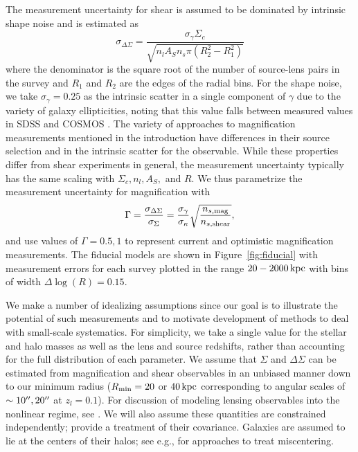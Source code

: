 \documentclass[12pt]{emulateapj}
\begin{document}
The measurement uncertainty for shear is assumed to be dominated by
intrinsic shape noise and is estimated as
\begin{equation}
\sigma_{\Delta\Sigma}=\frac{\sigma_{\gamma}\Sigma_c}{\sqrt{n_l A_S n_s
  \pi(R_2^2-R_1^2)}}
\end{equation}
where the denominator is the square root of the number of source-lens
pairs in the survey and $R_1$ and $R_2$ are the edges of the radial
bins. For the shape noise, we take
$\sigma_{\gamma}=0.25$ as the intrinsic scatter in a single component
of $\gamma$ due to the variety of galaxy ellipticities, noting that this
value falls between measured values in SDSS \citet{Hirata2004} and
COSMOS \citet{Leauthaud2007}. The variety of approaches to
magnification measurements mentioned in the introduction have
differences in their source selection and in the intrinsic scatter for
the observable. While these properties differ from shear experiments
in general, the measurement uncertainty typically 
has the same scaling with $\Sigma_c, n_l, A_S,$ and $R$. We thus
parametrize the measurement uncertainty for magnification with 
\begin{equation}
\Gamma = \frac{\sigma_{\Delta\Sigma}}{\sigma_{\Sigma}} =
\frac{\sigma_\gamma}{\sigma_\kappa}\sqrt{\frac{n_{s, \rm{mag}}}{n_{s, \rm{shear}}}},
\end{equation}
and use values of $\Gamma=0.5, 1$ to represent current and optimistic
magnification measurements. The fiducial models are shown in
Figure~\ref{fig:fiducial} with measurement errors for each survey
plotted in the range $20-2000\,{\rm kpc}$ with bins of width
$\Delta\log(R)=0.15$.

We make a number of idealizing assumptions since our goal is to
illustrate the potential of such measurements and to motivate
development of methods to deal with small-scale systematics. For
simplicity, we take a single value for the stellar and halo masses as well as
the lens and source redshifts, rather than accounting for the full
distribution of each parameter. We assume that $\Sigma$ and
$\Delta\Sigma$ can be estimated from magnification and shear
observables in an unbiased manner down to our minimum radius ($R_{\rm
  min} = 20$ or $40\,\rm{kpc}$ corresponding to angular scales of
$\sim10\mbox{$^{\prime\prime}$}, 20\mbox{$^{\prime\prime}$}$ at $z_l=0.1$). For discussion of modeling
lensing observables into the nonlinear regime, see \citet{Menard2003,
  Takada2003, Mandelbaum2006}. We will also assume these quantities
are constrained independently; \citet{Rozo2010} provide a treatment
of their covariance. Galaxies are assumed to lie at the centers of
their halos; see e.g., \citet{Johnston2007, George2012} for
approaches to treat miscentering.
\end{document}
